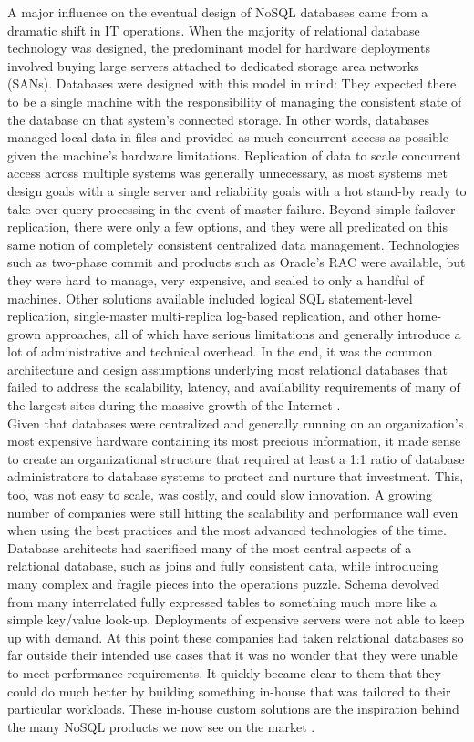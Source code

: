 \hspace*{0.7in} A major influence on the eventual design of NoSQL databases came from a dramatic shift in IT operations. When the majority of relational database technology was designed, the predominant model for hardware deployments involved buying large servers attached to dedicated storage area networks (SANs). Databases were designed with this model in mind: They expected there to be a single machine with the responsibility of managing the consistent state of the database on that system's connected storage. In other words, databases managed local data in files and provided as much concurrent access as possible given the machine's hardware limitations. Replication of data to scale concurrent access across multiple systems was generally unnecessary, as most systems met design goals with a single server and reliability goals with a hot stand-by ready to take over query processing in the event of master failure. Beyond simple failover replication, there were only a few options, and they were all predicated on this same notion of completely consistent centralized data management. Technologies such as two-phase commit and products such as Oracle's RAC were available, but they were hard to manage, very expensive, and scaled to only a handful of machines. Other solutions available included logical SQL statement-level replication, single-master multi-replica log-based replication, and other home-grown approaches, all of which have serious limitations and generally introduce a lot of administrative and technical overhead. In the end, it was the common architecture and design assumptions underlying most relational databases that failed to address the scalability, latency, and availability requirements of many of the largest sites during the massive growth of the Internet \cite{2}.
\\
\hspace*{0.7in} Given that databases were centralized and generally running on an organization's most expensive hardware containing its most precious information, it made sense to create an organizational structure that required at least a 1:1 ratio of database administrators to database systems to protect and nurture that investment. This, too, was not easy to scale, was costly, and could slow innovation. A growing number of companies were still hitting the scalability and performance wall even when using the best practices and the most advanced technologies of the time. Database architects had sacrificed many of the most central aspects of a relational database, such as joins and fully consistent data, while introducing many complex and fragile pieces into the operations puzzle. Schema devolved from many interrelated fully expressed tables to something much more like a simple key/value look-up. Deployments of expensive servers were not able to keep up with demand. At this point these companies had taken relational databases so far outside their intended use cases that it was no wonder that they were unable to meet performance requirements. It quickly became clear to them that they could do much better by building something in-house that was tailored to their particular workloads. These in-house custom solutions are the inspiration behind the many NoSQL products we now see on the market \cite{2}.
